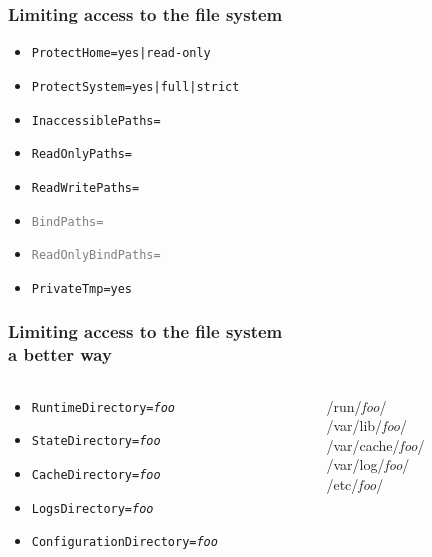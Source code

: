 \documentclass[serif]{beamer}
\begin{document}
\begin{frame}
  \frametitle{Limiting access to the file system}
  \begin{itemize}
  \item \texttt{ProtectHome=yes|read-only}
  \item \texttt{ProtectSystem=yes|full|strict}
    \pause

  \item \texttt{InaccessiblePaths=}
  \item \texttt{ReadOnlyPaths=}
  \item \texttt{ReadWritePaths=}

    \pause
  \item \texttt{\textcolor{gray}{BindPaths=}}
  \item \texttt{\textcolor{gray}{ReadOnlyBindPaths=}}

  \end{itemize}
\end{frame}

\begin{frame}
  \begin{itemize}
  \item \texttt{PrivateTmp=yes}
  \end{itemize}
\end{frame}

\begin{frame}
  \frametitle{Limiting access to the file system\\a better way}
  \pause
  \begin{columns}
    \begin{column}{0.6\textwidth}
      \begin{itemize}
      \item \texttt{RuntimeDirectory=\textit{foo}}
      \item \texttt{StateDirectory=\textit{foo}}
      \item \texttt{CacheDirectory=\textit{foo}}
      \item \texttt{LogsDirectory=\textit{foo}}
      \item \texttt{ConfigurationDirectory=\textit{foo}}
      \end{itemize}
    \end{column}
    \color{gray}
    \begin{column}{0.4\textwidth}
      /run/\textit{foo}/ \\[.32em]
      /var/lib/\textit{foo}/ \\[.32em]
      /var/cache/\textit{foo}/ \\[.32em]
      /var/log/\textit{foo}/ \\[.32em]
      /etc/\textit{foo}/
    \end{column}
  \end{columns}
\end{frame}
\end{document}
